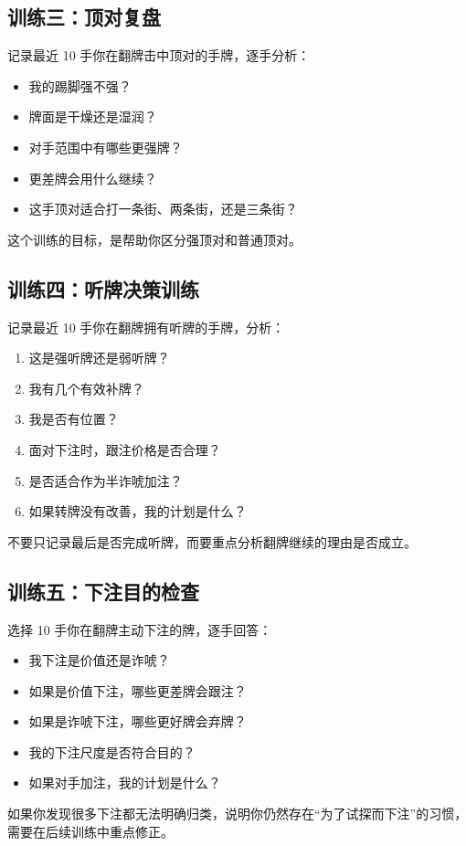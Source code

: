 \subsection*{训练三：顶对复盘}

记录最近 10 手你在翻牌击中顶对的手牌，逐手分析：

\begin{itemize}
\item 我的踢脚强不强？
\item 牌面是干燥还是湿润？
\item 对手范围中有哪些更强牌？
\item 更差牌会用什么继续？
\item 这手顶对适合打一条街、两条街，还是三条街？
\end{itemize}

这个训练的目标，是帮助你区分强顶对和普通顶对。

\subsection*{训练四：听牌决策训练}

记录最近 10 手你在翻牌拥有听牌的手牌，分析：

\begin{enumerate}
\item 这是强听牌还是弱听牌？
\item 我有几个有效补牌？
\item 我是否有位置？
\item 面对下注时，跟注价格是否合理？
\item 是否适合作为半诈唬加注？
\item 如果转牌没有改善，我的计划是什么？
\end{enumerate}

不要只记录最后是否完成听牌，而要重点分析翻牌继续的理由是否成立。

\subsection*{训练五：下注目的检查}

选择 10 手你在翻牌主动下注的牌，逐手回答：

\begin{itemize}
\item 我下注是价值还是诈唬？
\item 如果是价值下注，哪些更差牌会跟注？
\item 如果是诈唬下注，哪些更好牌会弃牌？
\item 我的下注尺度是否符合目的？
\item 如果对手加注，我的计划是什么？
\end{itemize}

如果你发现很多下注都无法明确归类，说明你仍然存在“为了试探而下注”的习惯，需要在后续训练中重点修正。
